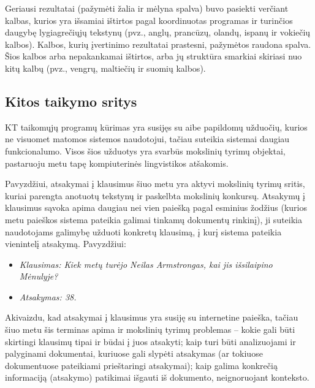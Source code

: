 \begin{multicols}{2}
  Geriausi rezultatai (pažymėti žalia ir mėlyna spalva) buvo pasiekti verčiant kalbas, kurios yra išsamiai ištirtos pagal koordinuotas programas ir turinčios daugybę lygiagrečiųjų tekstynų (pvz., anglų, prancūzų, olandų, ispanų ir vokiečių kalbos). Kalbos, kurių įvertinimo rezultatai prastesni, pažymėtos raudona spalva. Šios kalbos arba nepakankamai ištirtos, arba jų struktūra smarkiai skiriasi nuo kitų kalbų (pvz., vengrų, maltiečių ir suomių kalbos).


\subsection{Kitos taikymo sritys }

 KT taikomųjų programų kūrimas yra susijęs su aibe papildomų užduočių, kurios ne visuomet matomos sistemos naudotojui, tačiau suteikia sistemai daugiau funkcionalumo. Visos šios užduotys yra svarbūs mokslinių tyrimų objektai, pastaruoju metu tapę kompiuterinės lingvistikos atšakomis. 


Pavyzdžiui, atsakymai į klausimus šiuo metu yra aktyvi mokslinių tyrimų sritis, kuriai parengta anotuotų tekstynų ir paskelbta mokslinių konkursų. Atsakymų į klausimus sąvoka apima daugiau nei vien paiešką pagal esminius žodžius (kurios metu paieškos sistema pateikia galimai tinkamų dokumentų rinkinį), ji suteikia naudotojams galimybę užduoti konkretų klausimą, į kurį sistema pateikia vienintelį atsakymą. Pavyzdžiui:

\begin{itemize}
\item[] \textit{Klausimas: Kiek metų turėjo Neilas Armstrongas, kai jis išsilaipino Mėnulyje?}
\item[] \textit{Atsakymas: 38.}
\end{itemize}

Akivaizdu, kad atsakymai į klausimus yra susiję su internetine paieška, tačiau šiuo metu šis terminas apima ir mokslinių tyrimų problemas – kokie gali būti skirtingi klausimų tipai ir būdai į juos atsakyti; kaip turi būti analizuojami ir palyginami dokumentai, kuriuose gali slypėti atsakymas (ar tokiuose dokumentuose pateikiami prieštaringi atsakymai); kaip galima konkrečią informaciją (atsakymo) patikimai išgauti iš dokumento, neignoruojant konteksto.    




\end{multicols}
